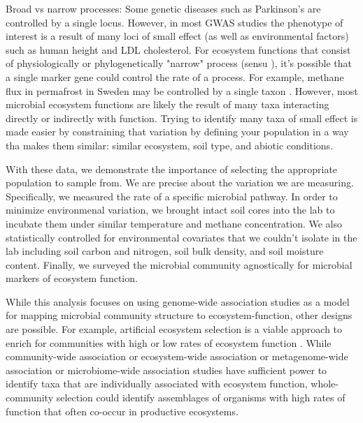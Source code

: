 \documentclass{article}
\begin{document}
Broad vs narrow processes: Some genetic diseases such as Parkinson's 
are controlled by a single locus. However, in most GWAS studies the phenotype of
interest is a result of many loci of small effect (as well as environmental
factors) such as human height and LDL cholesterol. For ecosystem functions that
consist of physiologically or phylogenetically "narrow" process (sensu
\cite{schimel1995b}), it's possible that a single marker gene could control the
rate of a process. For example, methane flux in permafrost in Sweden may be
controlled by a single taxon \citep{mccalley2014}. However, most microbial ecosystem functions are likely the result
of many taxa interacting directly or indirectly with function.
Trying to identify many taxa of small effect is made easier by constraining that
variation by defining your population in a way tha makes them similar: 
similar ecosystem, soil type, and abiotic conditions.

With these data, we demonstrate the
importance of selecting the appropriate population to sample from. We are
precise about the variation we are measuring. Specifically, we measured the rate
of a specific microbial pathway. In order to minimize environmenal variation, we
brought intact soil cores into the lab to incubate them under similar
temperature and methane concentration. We also statistically controlled for
environmental covariates that we couldn't isolate in the lab including soil
carbon and nitrogen, soil bulk density, and soil moisture content. Finally, we
surveyed the microbial community agnostically for microbial markers of ecosystem
function.

While this analysis focuses on using genome-wide association studies as a model
for mapping microbial community structure to ecosystem-function, other designs
are possible. For example, artificial ecosystem selection is a viable approach
to enrich for communities with high or low rates of ecosystem function
\citep{swenson2000, panke-buisse2015}. While community-wide association or
ecosystem-wide association or metagenome-wide association or microbiome-wide
association studies have sufficient power to identify taxa that are individually
associated with ecosystem function, whole-community selection could identify
assemblages of organisms with high rates of function that often co-occur in
productive ecosystems.
\end{document}

